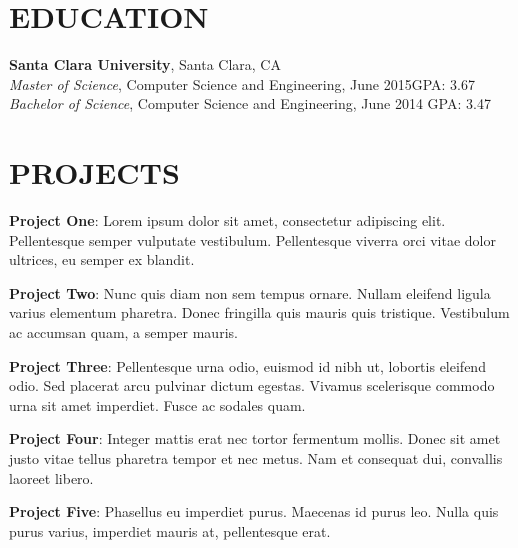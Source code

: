 \documentclass[mm]{simple_style}
\begin{document}
\begin{resume}

\section{EDUCATION}
\textbf{Santa Clara University}, Santa Clara, CA\\
{\sl Master of Science}, Computer Science and Engineering, June 2015\hfill GPA: 
3.67
\\
{\sl Bachelor of Science}, Computer Science and Engineering, June 2014\hfill 
GPA: 3.47
\sectionline

\section{PROJECTS}
\par
\textbf{Project One}: 
Lorem ipsum dolor sit amet, consectetur adipiscing elit. Pellentesque semper 
vulputate vestibulum. Pellentesque viverra orci vitae dolor ultrices, eu semper 
ex blandit. 

\par
\textbf{Project Two}:
Nunc quis diam non sem tempus ornare. Nullam eleifend ligula varius 
elementum pharetra. Donec fringilla quis mauris quis tristique. Vestibulum ac 
accumsan quam, a semper mauris. 
\par
\textbf{Project Three}: 
Pellentesque urna odio, euismod id nibh ut,  lobortis eleifend odio. Sed 
placerat arcu pulvinar dictum egestas. Vivamus  scelerisque commodo urna sit 
amet imperdiet. Fusce ac sodales quam.

\par
\textbf{Project Four}: 
Integer mattis erat nec tortor fermentum mollis. Donec sit amet justo vitae 
tellus pharetra tempor et nec metus. Nam et consequat dui, convallis laoreet 
libero. 

\par
\textbf{Project Five}: 
Phasellus eu imperdiet purus. Maecenas id purus leo. Nulla quis purus varius, 
imperdiet mauris at, pellentesque erat. 


\end{resume}
\end{document}
